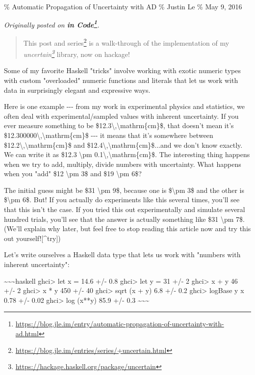 \documentclass[]{article}
\renewcommand{\href}[2]{#2\footnote{\url{#1}}}
\begin{document}
\% Automatic Propagation of Uncertainty with AD \% Justin Le \% May 9, 2016

\emph{Originally posted on
\textbf{\href{https://blog.jle.im/entry/automatic-propagation-of-uncertainty-with-ad.html}{in
Code}}.}

\begin{quote}
This post and \href{https://blog.jle.im/entries/series/+uncertain.html}{series}
is a walk-through of the implementation of my
\emph{\href{https://hackage.haskell.org/package/uncertain}{uncertain}} library,
now on hackage!
\end{quote}

Some of my favorite Haskell "tricks" involve working with exotic numeric types
with custom "overloaded" numeric functions and literals that let us work with
data in surprisingly elegant and expressive ways.

Here is one example -\/-\/- from my work in experimental physics and statistics,
we often deal with experimental/sampled values with inherent uncertainty. If you
ever measure something to be
\$12.3\textbackslash{},\textbackslash{}mathrm\{cm\}\$, that doesn't mean it's
\$12.300000\textbackslash{},\textbackslash{}mathrm\{cm\}\$ -\/-\/- it means that
it's somewhere between \$12.2\textbackslash{},\textbackslash{}mathrm\{cm\}\$ and
\$12.4\textbackslash{},\textbackslash{}mathrm\{cm\}\$...and we don't know
exactly. We can write it as \$12.3 \textbackslash{}pm
0.1\textbackslash{},\textbackslash{}mathrm\{cm\}\$. The interesting thing
happens when we try to add, multiply, divide numbers with uncertainty. What
happens when you "add" \$12 \textbackslash{}pm 3\$ and \$19 \textbackslash{}pm
6\$?

The initial guess might be \$31 \textbackslash{}pm 9\$, because one is
\$\textbackslash{}pm 3\$ and the other is \$\textbackslash{}pm 6\$. But! If you
actually do experiments like this several times, you'll see that this isn't the
case. If you tried this out experimentally and simulate several hundred trials,
you'll see that the answer is actually something like \$31 \textbackslash{}pm
7\$. (We'll explain why later, but feel free to stop reading this article now
and try this out yourself!{[}\^{}try{]})

Let's write ourselves a Haskell data type that lets us work with "numbers with
inherent uncertainty":

\textasciitilde{}\textasciitilde{}\textasciitilde{}haskell ghci\textgreater{}
let x = 14.6 +/- 0.8 ghci\textgreater{} let y = 31 +/- 2 ghci\textgreater{} x +
y 46 +/- 2 ghci\textgreater{} x * y 450 +/- 40 ghci\textgreater{} sqrt (x + y)
6.8 +/- 0.2 ghci\textgreater{} logBase y x 0.78 +/- 0.02 ghci\textgreater{} log
(x**y) 85.9 +/- 0.3 \textasciitilde{}\textasciitilde{}\textasciitilde{}
\end{document}
